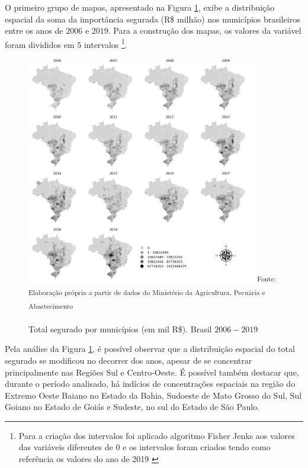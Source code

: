 O primeiro grupo de mapas, apresentado na Figura \ref{map_segurado}, exibe a distribuição espacial da soma da importância segurada (R\$ milhão) nos municípios brasileiros entre os anos de $2006$ e $2019$. Para a construção dos mapas, os valores da variável foram divididos em 5 intervalos \footnote{Para a criação dos intervalos foi aplicado algoritmo Fisher Jenks aos valores das variáveis diferentes de $0$ e os intervalos foram criados tendo como referência os valores do ano de 2019 \cite{jenks77}}.

\begin{figure}[H]
	\centering
	\caption{Total segurado por municípios (em mil R\$). Brasil $2006 - 2019$}
	\includegraphics[width=0.9\textwidth]{figuras/map_total_segurado_mil.png}
	\small \textsuperscript {Fonte: Elaboração própria a partir de dados do Ministério da Agricultura, Pecuária e Abastecimento \cite{brasil21b}}
    \label{map_segurado}
\end{figure}

Pela análise da Figura \ref{map_segurado}, é possível observar que a distribuição espacial do total segurado se modificou no decorrer dos anos, apesar de se concentrar principalmente nas Regiões Sul e Centro-Oeste. É possível também destacar que, durante o período analisado, há indícios de concentrações espaciais na região do Extremo Oeste Baiano no Estado da Bahia, Sudoeste de Mato Grosso do Sul, Sul Goiano no Estado de Goiás e Sudeste, no sul do Estado de São Paulo.

